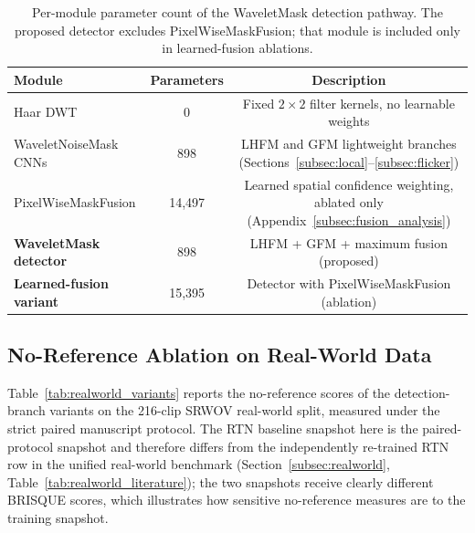 {\begin{table}[H]
\caption{Per-module parameter count of the WaveletMask detection pathway. The proposed detector excludes PixelWiseMaskFusion; that module is included only in learned-fusion ablations.\label{tab:module_overhead}}
\begin{tabularx}{\textwidth}{lCC}
\toprule
\textbf{Module} & \textbf{Parameters} & \textbf{Description} \\
\midrule
Haar DWT               & 0        & Fixed $2\times2$ filter kernels, no learnable weights \\
WaveletNoiseMask CNNs  & 898      & LHFM and GFM lightweight branches (Sections~\ref{subsec:local}--\ref{subsec:flicker}) \\
PixelWiseMaskFusion    & 14,497    & Learned spatial confidence weighting, ablated only (Appendix~\ref{subsec:fusion_analysis}) \\
\midrule
\textbf{WaveletMask detector}  & 898  & LHFM + GFM + maximum fusion (proposed) \\
\textbf{Learned-fusion variant} & 15,395 & Detector with PixelWiseMaskFusion (ablation) \\
\bottomrule
\end{tabularx}
\end{table}

\subsection{No-Reference Ablation on Real-World Data}\label{subsec:realworld_ablation}

Table~\ref{tab:realworld_variants} reports the no-reference scores of the detection-branch variants on the 216-clip SRWOV real-world split, measured under the strict paired manuscript protocol. The RTN baseline snapshot here is the paired-protocol snapshot and therefore differs from the independently re-trained RTN row in the unified real-world benchmark (Section~\ref{subsec:realworld}, Table~\ref{tab:realworld_literature}); the two snapshots receive clearly different BRISQUE scores, which illustrates how sensitive no-reference measures are to the training snapshot.

}
